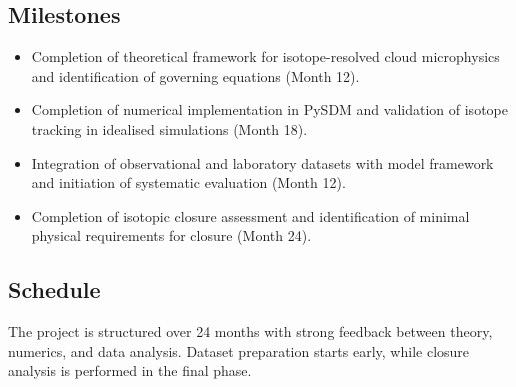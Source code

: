\documentclass[12pt]{article}
\begin{document}
\subsection*{Milestones}

\begin{itemize}

\item[\textbf{M1}] Completion of theoretical framework for isotope-resolved cloud microphysics
and identification of governing equations (Month 12).

\item[\textbf{M2}] Completion of numerical implementation in PySDM and validation of isotope tracking
in idealised simulations (Month 18).

\item[\textbf{M3}] Integration of observational and laboratory datasets with model framework
and initiation of systematic evaluation (Month 12).

\item[\textbf{M4}] Completion of isotopic closure assessment and identification of minimal physical
requirements for closure (Month 24).

\end{itemize}

\subsection*{Schedule}

The project is structured over 24 months with strong feedback between theory,
numerics, and data analysis. Dataset preparation starts early, while closure
analysis is performed in the final phase.
\end{document}
